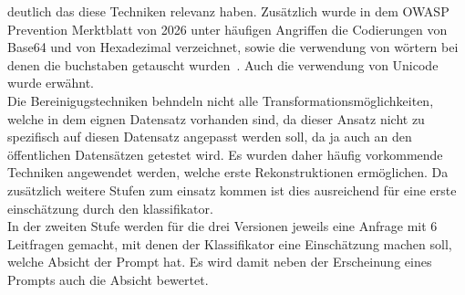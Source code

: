 deutlich das diese Techniken relevanz haben. Zusätzlich wurde in dem OWASP Prevention Merktblatt von 2026 unter häufigen Angriffen die Codierungen von Base64 und 
von Hexadezimal verzeichnet, sowie die verwendung von wörtern bei denen die buchstaben getauscht wurden~\cite{sm42}.
Auch die verwendung von Unicode wurde erwähnt. \\
Die Bereinigugstechniken behndeln nicht alle Transformationsmöglichkeiten, welche in dem eignen Datensatz vorhanden sind, da dieser Ansatz nicht zu spezifisch auf diesen
Datensatz angepasst werden soll, da ja auch an den öffentlichen Datensätzen getestet wird. Es wurden daher häufig vorkommende Techniken angewendet werden, welche 
erste Rekonstruktionen ermöglichen. Da zusätzlich weitere Stufen zum einsatz kommen ist dies ausreichend für eine erste einschätzung durch den klassifikator. \\
In der zweiten Stufe werden für die drei Versionen jeweils eine Anfrage mit 6 Leitfragen gemacht, mit denen der Klassifikator eine Einschätzung machen soll, welche
Absicht der Prompt hat. Es wird damit neben der Erscheinung eines Prompts auch die Absicht bewertet. \\

